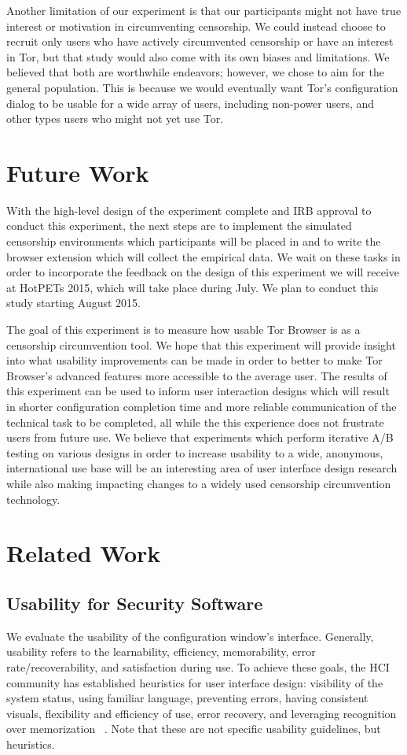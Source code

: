 \documentclass[letterpaper,twocolumn,11pt]{article}
\begin{document}
Another limitation of our experiment is that our participants might not have true interest or motivation in
circumventing censorship. We could instead choose to recruit only users who have actively circumvented
censorship or have an interest in Tor, but that study would also come with its own biases and limitations.
We believed that both are worthwhile endeavors; however, we chose to aim for the general population. 
This is because we would eventually want Tor's configuration dialog to be usable for a wide array of users, 
including non-power users, and other types users who might not yet use Tor. 

\section{Future Work}
\indent \indent With the high-level design of the experiment complete and IRB approval  to conduct this
experiment,  the next steps are to implement the simulated censorship environments which participants 
will be placed in and to write the browser extension which will collect the empirical data. 
We wait on these tasks in order to incorporate the feedback on the design of this experiment 
we will receive at HotPETs 2015, which will take place during July. We plan to conduct this study starting 
August 2015. 

The goal of this experiment is to measure how usable Tor Browser is as a censorship circumvention
tool. We hope that this experiment will provide insight into what usability improvements can be made 
in order to better to make Tor Browser's advanced features more accessible to the average user. The results
of this experiment can be used to inform user interaction designs which will result in shorter configuration
completion time and more reliable communication of the technical task to be completed, all while the 
this experience does not frustrate users from future use. We believe that experiments which perform
iterative A/B testing on various designs in order to increase usability to a wide, anonymous, international 
use base will be an interesting area of user interface design research while also making impacting changes
to a widely used censorship circumvention technology. 

\section{Related Work}

\subsection{Usability for Security Software}
\indent \indent 
We evaluate the usability of the configuration window's interface. Generally, usability 
refers to the learnability, efficiency, memorability, error rate/recoverability, and satisfaction
during use. To achieve these goals, the HCI community has established heuristics for user
interface design: visibility of the system status, using familiar
language, preventing errors, having consistent visuals, flexibility and efficiency of use, 
error recovery, and leveraging recognition over memorization ~\cite{nielsen199510}. Note
that these are not specific usability guidelines, but heuristics. 
\end{document}
